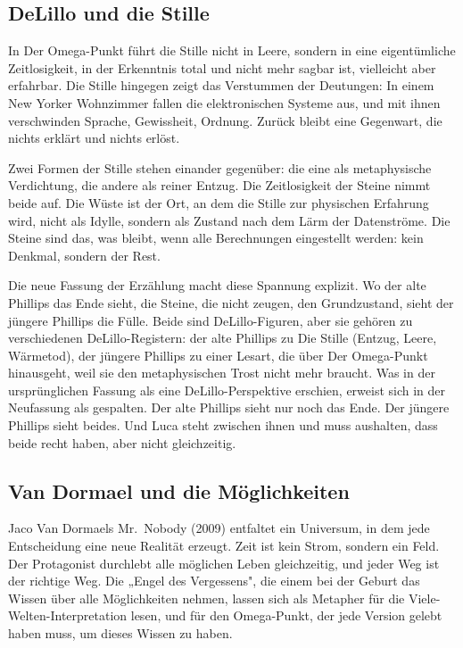 \documentclass[
  ngerman,
]{article}
\begin{document}
\subsection{DeLillo und die Stille}\label{delillo-und-die-stille}

In Der Omega-Punkt führt die Stille nicht in Leere, sondern in eine
eigentümliche Zeitlosigkeit, in der Erkenntnis total und nicht mehr
sagbar ist, vielleicht aber erfahrbar. Die Stille hingegen zeigt das
Verstummen der Deutungen: In einem New Yorker Wohnzimmer fallen die
elektronischen Systeme aus, und mit ihnen verschwinden Sprache,
Gewissheit, Ordnung. Zurück bleibt eine Gegenwart, die nichts erklärt
und nichts erlöst.

Zwei Formen der Stille stehen einander gegenüber: die eine als
metaphysische Verdichtung, die andere als reiner Entzug. Die
Zeitlosigkeit der Steine nimmt beide auf. Die Wüste ist der Ort, an dem
die Stille zur physischen Erfahrung wird, nicht als Idylle, sondern als
Zustand nach dem Lärm der Datenströme. Die Steine sind das, was bleibt,
wenn alle Berechnungen eingestellt werden: kein Denkmal, sondern der
Rest.

Die neue Fassung der Erzählung macht diese Spannung explizit. Wo der
alte Phillips das Ende sieht, die Steine, die nicht zeugen, den
Grundzustand, sieht der jüngere Phillips die Fülle. Beide sind
DeLillo-Figuren, aber sie gehören zu verschiedenen DeLillo-Registern:
der alte Phillips zu Die Stille (Entzug, Leere, Wärmetod), der jüngere
Phillips zu einer Lesart, die über Der Omega-Punkt hinausgeht, weil sie
den metaphysischen Trost nicht mehr braucht. Was in der ursprünglichen
Fassung als eine DeLillo-Perspektive erschien, erweist sich in der
Neufassung als gespalten. Der alte Phillips sieht nur noch das Ende. Der
jüngere Phillips sieht beides. Und Luca steht zwischen ihnen und muss
aushalten, dass beide recht haben, aber nicht gleichzeitig.

\subsection{Van Dormael und die
Möglichkeiten}\label{van-dormael-und-die-muxf6glichkeiten}

Jaco Van Dormaels Mr.~Nobody (2009) entfaltet ein Universum, in dem jede
Entscheidung eine neue Realität erzeugt. Zeit ist kein Strom, sondern
ein Feld. Der Protagonist durchlebt alle möglichen Leben gleichzeitig,
und jeder Weg ist der richtige Weg. Die „Engel des Vergessens", die
einem bei der Geburt das Wissen über alle Möglichkeiten nehmen, lassen
sich als Metapher für die Viele-Welten-Interpretation lesen, und für den
Omega-Punkt, der jede Version gelebt haben muss, um dieses Wissen zu
haben.
\end{document}
